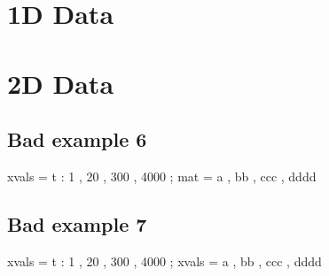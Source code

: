 \documentclass[12pt]{article}
\begin{document}


\section{1D Data}



\section{2D Data}

%
%
%
%
%
%
%
%
%
%


\subsection{Bad example 6}

\begin{functable}
    xvals = t : 1 , 20 , 300 , 4000 ;
    mat   = a , bb , ccc , dddd 
\end{functable}


\subsection{Bad example 7}

\begin{functable}
    xvals = t : 1 , 20 , 300 , 4000 ;
    xvals = a , bb , ccc , dddd 
\end{functable}
\end{document}
